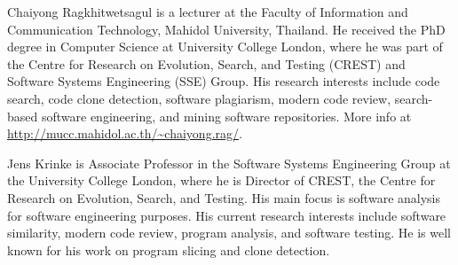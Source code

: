 \documentclass[10pt,journal,compsoc]{IEEEtran}
\begin{document}
\begin{IEEEbiography}{Chaiyong Ragkhitwetsagul}
is a lecturer at the Faculty of Information and Communication Technology, Mahidol University, Thailand. He received the PhD degree in Computer Science at University College London, where he was part of the Centre for Research on Evolution, Search, and Testing (CREST) and Software Systems Engineering (SSE) Group. His research interests include code search, code clone detection, software plagiarism, modern code review, search-based software engineering, and mining software repositories. More info at \url{http://mucc.mahidol.ac.th/~chaiyong.rag/}.
\end{IEEEbiography}

\begin{IEEEbiography}{Jens Krinke}
is Associate Professor in the Software Systems Engineering
Group at the University College London, where he is Director of CREST,
the Centre for Research on Evolution, Search, and Testing.  His main
focus is software analysis for software engineering purposes. His
current research interests include software
similarity, modern code review, program analysis, and software testing.  He is well known for his work on
program slicing and clone detection.
\end{IEEEbiography}
\end{document}
